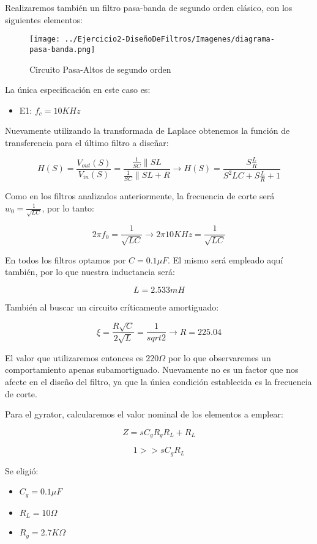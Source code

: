Realizaremos también un filtro pasa-banda de segundo orden clásico, con los siguientes elementos:

\begin{figure}[H]
    \centering
    \texttt{[image: ../Ejercicio2-DiseñoDeFiltros/Imagenes/diagrama-pasa-banda.png]}
    \caption{Circuito Pasa-Altos de segundo orden}
\end{figure}

La única especificación en este caso es:

\begin{itemize}
	\item E1: $f_c=10 KHz$
\end{itemize}

Nuevamente utilizando la transformada de Laplace obtenemos la función de transferencia para el último filtro
a diseñar:

$$H(S)=\frac{V_{out}(S)}{V_{in}(S)}=\frac{\frac{1}{SC}\parallel SL}{\frac{1}{SC}\parallel SL + R} \longrightarrow 
H(S)=\frac{S\frac{L}{R}}{S^2LC+S\frac{L}{R}+1}$$

Como en los filtros analizados anteriormente, la frecuencia de corte
será $w_0=\frac{1}{\sqrt{LC}}$, por lo tanto:

$$2 \pi f_0 = \frac{1}{\sqrt{LC}} \longrightarrow 2 \pi 10KHz = \frac{1}{\sqrt{LC}}$$

En todos los filtros optamos por $C=0.1 \mu F$. El mismo será empleado aquí también, por lo que nuestra inductancia será:

$$L = 2.533 mH$$

También al buscar un circuito críticamente amortiguado:

$$\xi=\frac{R \sqrt{C}}{2\sqrt{L}}=\frac{1}{sqrt{2}} \longrightarrow R=225.04$$

El valor que utilizaremos entonces es $220 \Omega$ por lo que observaremes un comportamiento apenas subamortiguado.
Nuevamente no es un factor que nos afecte en el diseño del filtro, ya que la única condición establecida es la frecuencia
de corte.

Para el gyrator, calcularemos el valor nominal de los elementos a emplear:

$$Z=sC_gR_gR_L+R_L$$

$$1 >> sC_gR_L$$

Se eligió:

\begin{itemize}
	\item $C_g=0.1 \mu F$
	\item $R_L=10 \Omega$
	\item $R_g=2.7K \Omega$
\end{itemize}

